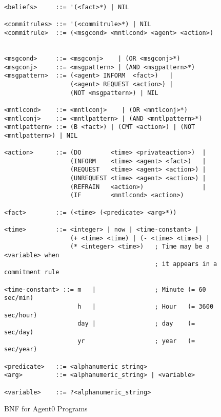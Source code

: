 \begin{figure}
\begin{verbatim}
<beliefs>     ::= '(<fact>*) | NIL

<commitrules> ::= '(<commitrule>*) | NIL
<commitrule>  ::= (<msgcond> <mntlcond> <agent> <action>)


<msgcond>     ::= <msgconj>    | (OR <msgconj>*)
<msgconj>     ::= <msgpattern> | (AND <msgpattern>*)
<msgpattern>  ::= (<agent> INFORM  <fact>)   |
                  (<agent> REQUEST <action>) |
                  (NOT <msgpattern>) | NIL

<mntlcond>    ::= <mntlconj>    | (OR <mntlconj>*)
<mntlconj>    ::= <mntlpattern> | (AND <mntlpattern>*)
<mntlpattern> ::= (B <fact>) | (CMT <action>) | (NOT <mntlpattern>) | NIL

<action>      ::= (DO        <time> <privateaction>)  |
                  (INFORM    <time> <agent> <fact>)   |
                  (REQUEST   <time> <agent> <action>) |
                  (UNREQUEST <time> <agent> <action>) |
                  (REFRAIN   <action>)                |
                  (IF        <mntlcond> <action>)

<fact>        ::= (<time> (<predicate> <arg>*))

<time>        ::= <integer> | now | <time-constant> |
                  (+ <time> <time) | (- <time> <time>) |
                  (* <integer> <time>)   ; Time may be a <variable> when
                                         ; it appears in a commitment rule

<time-constant> ::= m   |                ; Minute (= 60 sec/min)
                    h   |                ; Hour   (= 3600 sec/hour)
                    day |                ; day    (= sec/day)
                    yr                   ; year   (= sec/year)

<predicate>   ::= <alphanumeric_string>
<arg>         ::= <alphanumeric_string> | <variable>

<variable>    ::= ?<alphanumeric_string>
\end{verbatim}
\caption{BNF for Agent0 Programs}
\end{figure}





